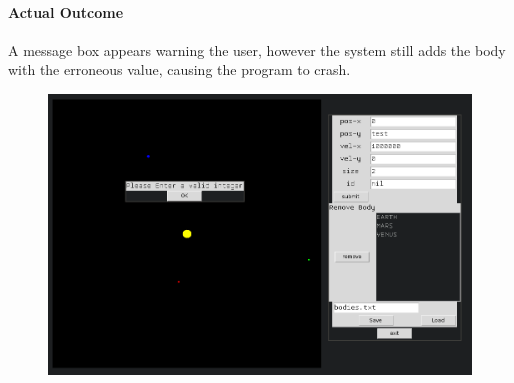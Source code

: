 \paragraph{Actual Outcome}
A message box appears warning the user, however the system still adds the body
with the erroneous value, causing the program to crash.
\begin{figure}[H]
	\includegraphics[width=\textwidth]{./img/add2.png}
\end{figure}

